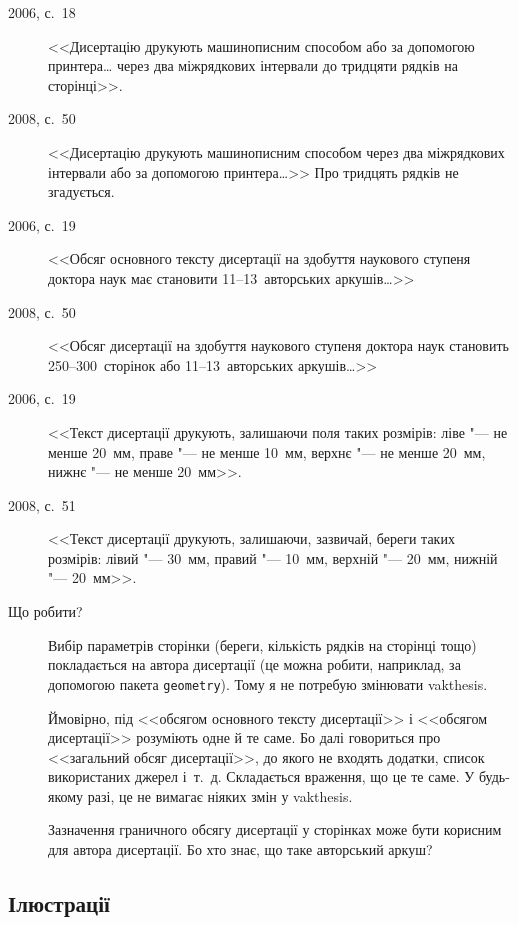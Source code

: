 \documentclass[a4paper]{article}
\newcommand{\vakthesis}{\textsf{vakthesis}}
\begin{document}
\begin{description}
\item[2006, с.~18] <<Дисертацію друкують машинописним способом або за
  допомогою принтера\ldots{} через два міжрядкових інтервали до
  тридцяти рядків на сторінці>>.

\item[2008, с.~50] <<Дисертацію друкують машинописним способом через
  два міжрядкових інтервали або за допомогою принтера\ldots{}>> Про
  тридцять рядків не згадується.

\item[2006, с.~19] <<Обсяг основного тексту дисертації на здобуття
  наукового ступеня доктора наук має становити 11--13~авторських
  аркушів\ldots{}>>

\item[2008, с.~50] <<Обсяг дисертації на здобуття наукового ступеня
  доктора наук становить 250--300~сторінок або 11--13~авторських
  аркушів\ldots{}>>

\item[2006, с.~19] <<Текст дисертації друкують, залишаючи поля таких
  розмірів: ліве "--- не менше 20~мм, праве "--- не менше 10~мм,
  верхнє "--- не менше 20~мм, нижнє "--- не менше 20~мм>>.

\item[2008, с.~51] <<Текст дисертації друкують, залишаючи, зазвичай,
  береги таких розмірів: лівий "--- 30~мм, правий "--- 10~мм, верхній
  "--- 20~мм, нижній "--- 20~мм>>.

\item[Що робити?] Вибір параметрів сторінки (береги, кількість рядків
  на сторінці тощо) покладається на автора дисертації (це можна
  робити, наприклад, за допомогою пакета \verb|geometry|). Тому я не
  потребую змінювати \vakthesis{}.

  Ймовірно, під <<обсягом основного тексту дисертації>> і <<обсягом
  дисертації>> розуміють одне й те саме. Бо далі говориться про
  <<загальний обсяг дисертації>>, до якого не входять додатки, список
  використаних джерел і~т.~д. Складається враження, що це те саме. У
  будь-якому разі, це не вимагає ніяких змін у \vakthesis{}.

  Зазначення граничного обсягу дисертації у сторінках може бути
  корисним для автора дисертації. Бо хто знає, що таке авторський
  аркуш?
\end{description}

\subsection{Ілюстрації}
\end{document}
